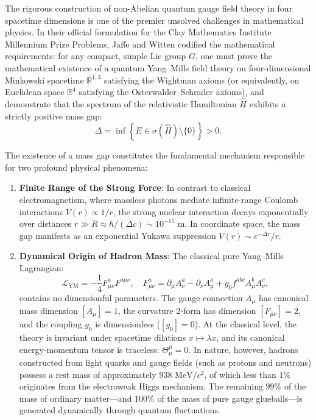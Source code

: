 \documentclass[11pt,reqno]{amsart}
\theoremstyle{plain}
\theoremstyle{definition}
\theoremstyle{remark}
\numberwithin{equation}{section}
\begin{document}
The rigorous construction of non-Abelian quantum gauge field theory in four spacetime dimensions is one of the premier unsolved challenges in mathematical physics. In their official formulation for the Clay Mathematics Institute Millennium Prize Problems, Jaffe and Witten \cite{JaffeWitten2000} codified the mathematical requirements: for any compact, simple Lie group $G$, one must prove the mathematical existence of a quantum Yang--Mills field theory on four-dimensional Minkowski spacetime $\mathbb{R}^{1,3}$ satisfying the Wightman axioms (or equivalently, on Euclidean space $\mathbb{R}^4$ satisfying the Osterwalder--Schrader axioms), and demonstrate that the spectrum of the relativistic Hamiltonian $\hat{H}$ exhibits a strictly positive mass gap:
\begin{equation}
\label{eq:mass_gap_def}
\Delta = \inf \left\{ E \in \sigma(\hat{H}) \setminus \{0\} \right\} > 0.
\end{equation}

The existence of a mass gap constitutes the fundamental mechanism responsible for two profound physical phenomena:
\begin{enumerate}
    \item \textbf{Finite Range of the Strong Force}: In contrast to classical electromagnetism, where massless photons mediate infinite-range Coulomb interactions $V(r) \propto 1/r$, the strong nuclear interaction decays exponentially over distances $r \gg R \approx \hbar / (\Delta c) \sim 10^{-15}\text{ m}$. In coordinate space, the mass gap manifests as an exponential Yukawa suppression $V(r) \sim e^{-\Delta r}/r$.
    \item \textbf{Dynamical Origin of Hadron Mass}: The classical pure Yang--Mills Lagrangian:
    \begin{equation}
    \mathcal{L}_{\mathrm{YM}} = -\frac{1}{4} F_{\mu\nu}^a F^{a\mu\nu}, \quad F_{\mu\nu}^a = \partial_\mu A_\nu^a - \partial_\nu A_\mu^a + g_0 f^{abc} A_\mu^b A_\nu^c,
    \end{equation}
    contains no dimensionful parameters. The gauge connection $A_\mu$ has canonical mass dimension $[A_\mu] = 1$, the curvature 2-form has dimension $[F_{\mu\nu}] = 2$, and the coupling $g_0$ is dimensionless ($[g_0] = 0$). At the classical level, the theory is invariant under spacetime dilations $x \mapsto \lambda x$, and its canonical energy-momentum tensor is traceless: $\Theta_\mu^\mu = 0$. In nature, however, hadrons constructed from light quarks and gauge fields (such as protons and neutrons) possess a rest mass of approximately $938\text{ MeV}/c^2$, of which less than $1\%$ originates from the electroweak Higgs mechanism. The remaining $99\%$ of the mass of ordinary matter—and $100\%$ of the mass of pure gauge glueballs—is generated dynamically through quantum fluctuations.
\end{enumerate}
\end{document}
